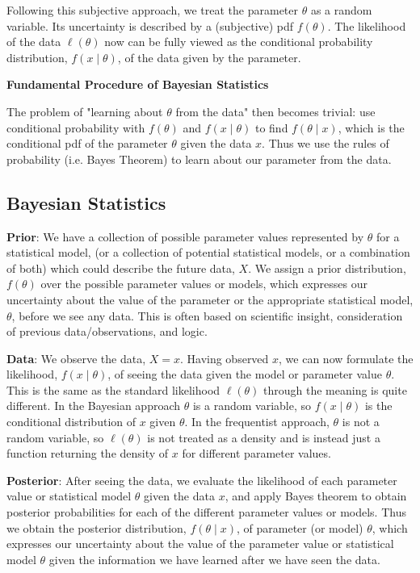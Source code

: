 \documentclass[10pt, a4paper]{article}
\begin{document}
Following this subjective approach,
we treat the parameter $\theta$ as a random variable.
Its uncertainty is described by a
(subjective)
pdf $f(\theta)$.
The likelihood of the data $\ell(\theta)$ now can be fully viewed as the conditional probability distribution,
$f(x\mid\theta)$,
of the data given by the parameter.

\textbf{Fundamental Procedure of Bayesian Statistics}

The problem of "learning about $\theta$ from the data" then becomes trivial:
use conditional probability with $f(\theta)$ and $f(x\mid\theta)$ to find $f(\theta\mid x)$,
which is the conditional pdf of the parameter $\theta$ given the data $x$.
Thus we use the rules of probability
(i.e. Bayes Theorem)
to learn about our parameter from the data.

\subsection{Bayesian Statistics}

\textbf{Prior}:
We have a collection of possible parameter values represented by $\theta$ for a statistical model,
(or a collection of potential statistical models,
or a combination of both)
which could describe the future data,
$X$.
We assign a prior distribution,
$f(\theta)$ over the possible parameter values or models,
which expresses our uncertainty about the value of the parameter or the appropriate statistical model,
$\theta$,
before we see any data.
This is often based on scientific insight,
consideration of previous data/observations,
and logic.

\textbf{Data}:
We observe the data,
$X = x$.
Having observed $x$,
we can now formulate the likelihood,
$f(x\mid\theta)$,
of seeing the data given the model or parameter value $\theta$.
This is the same as the standard likelihood $\ell(\theta)$ through the meaning is quite different.
In the Bayesian approach $\theta$ is a random variable,
so $f(x\mid\theta)$ is the conditional distribution of $x$ given $\theta$.
In the frequentist approach,
$\theta$ is not a random variable,
so $\ell(\theta)$ is not treated as a density and is instead just a function returning the density of $x$ for different parameter values.

\textbf{Posterior}:
After seeing the data,
we evaluate the likelihood of each parameter value or statistical model $\theta$ given the data $x$,
and apply Bayes theorem to obtain posterior probabilities for each of the different parameter values or models.
Thus we obtain the posterior distribution,
$f(\theta\mid x)$,
of parameter
(or model)
$\theta$,
which expresses our uncertainty about the value of the parameter value or statistical model $\theta$ given the information we have learned after we have seen the data.
\end{document}
